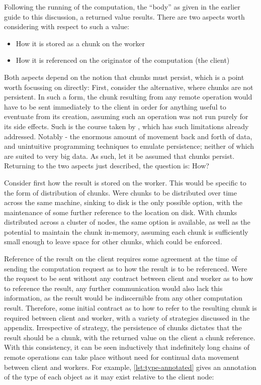 Following the running of the computation, the ``body'' as given in the
earlier guide to this discussion, a returned value results. There are
two aspects worth considering with respect to such a value:

\begin{itemize}
    \item
          How it is stored as a chunk on the worker
    \item
          How it is referenced on the originator of the computation (the client)
\end{itemize}

Both aspects depend on the notion that chunks must persist, which is a
point worth focussing on directly: First, consider the alternative,
where chunks are not persistent. In such a form, the chunk resulting
from any remote operation would have to be sent immediately to the
client in order for anything useful to eventuate from its creation,
assuming such an operation was not run purely for its side effects. Such
is the course taken by , which has such limitations already
addressed. Notably - the enormous amount of movement back and forth of
data, and unintuitive programming techniques to emulate persistence;
neither of which are suited to very big data. As such, let it be assumed
that chunks persist. Returning to the two aspects just described, the
question is: How?

Consider first how the result is stored on the worker. This would be
specific to the form of distribution of chunks. Were chunks to be
distributed over time across the same machine, sinking to disk is the
only possible option, with the maintenance of some further reference to
the location on disk. With chunks distributed across a cluster of nodes,
the same option is available, as well as the potential to maintain the
chunk in-memory, assuming each chunk is sufficiently small enough to
leave space for other chunks, which could be enforced.

Reference of the result on the client requires some agreement at the
time of sending the computation request as to how the result is to be
referenced. Were the request to be sent without any contract between
client and worker as to how to reference the result, any further
communication would also lack this information, as the result would be
indiscernible from any other computation result. Therefore, some initial
contract as to how to refer to the resulting chunk is required between
client and worker, with a variety of strategies discussed in the
appendix. Irrespective of strategy, the persistence of chunks dictates
that the result should be a chunk, with the returned value on the client
a chunk reference. With this consistency, it can be seen inductively
that indefinitely long chains of remote operations can take place
without need for continual data movement between client and workers. For
example, \cref{lst:type-annotated} gives an annotation of the type of each
object as it may exist relative to the client node:

